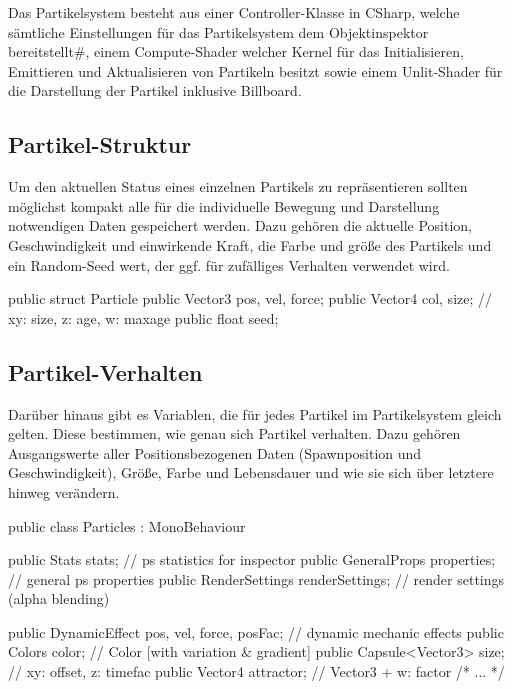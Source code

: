 Das Partikelsystem besteht aus einer Controller-Klasse in CSharp, welche sämtliche Einstellungen für das Partikelsystem dem Objektinspektor bereitstellt\#, einem Compute-Shader welcher Kernel für das Initialisieren, Emittieren und Aktualisieren von Partikeln besitzt sowie einem Unlit-Shader für die Darstellung der Partikel inklusive Billboard.


\subsection{Partikel-Struktur}

Um den aktuellen Status eines einzelnen Partikels zu repräsentieren sollten möglichst kompakt alle für die individuelle Bewegung und Darstellung notwendigen Daten gespeichert werden. Dazu gehören die aktuelle Position, Geschwindigkeit und einwirkende Kraft, die Farbe und grö{\ss}e des Partikels und ein Random-Seed wert, der ggf. für zufälliges Verhalten verwendet wird.

\begin{csh}[caption=Partikelstruktur,label=lst:particle]
public struct Particle
{
    public Vector3 pos, vel, force;
    public Vector4 col, size; // xy: size,  z: age, w: maxage
    public float seed;
}
\end{csh}


\subsection{Partikel-Verhalten}

Darüber hinaus gibt es Variablen, die für jedes Partikel im Partikelsystem gleich gelten. Diese bestimmen, wie genau sich Partikel verhalten. Dazu gehören Ausgangswerte aller Positionsbezogenen Daten (Spawnposition und Geschwindigkeit), Grö{\ss}e, Farbe und Lebensdauer und wie sie sich über letztere hinweg verändern.

\begin{csh}
public class Particles : MonoBehaviour
{
    public Stats stats;                   // ps statistics for inspector
    public GeneralProps properties;       // general ps properties
    public RenderSettings renderSettings; // render settings (alpha blending)

    public DynamicEffect pos, vel, force, posFac; // dynamic mechanic effects
    public Colors color;          // Color [with variation & gradient]
    public Capsule<Vector3> size; // xy: offset, z: timefac
    public Vector4 attractor;     // Vector3 + w: factor
    /* ... */
}
\end{csh}



